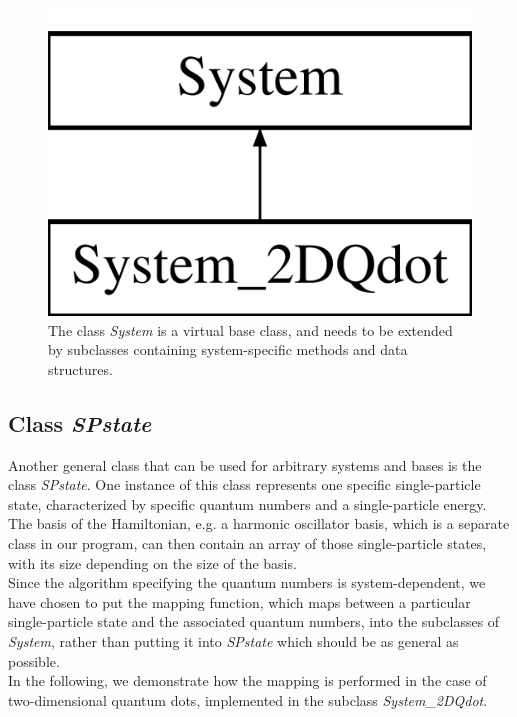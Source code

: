 \begin{figure}
\begin{center}
\includegraphics[scale=0.15]{../Plots/classSystem.pdf}
\end{center}
\caption{The class \textit{System} is a virtual base class, and needs to be extended by subclasses containing system-specific methods and data structures.}
\label{fig:classSystem}
\end{figure}


\subsection{Class \textit{SPstate}}
Another general class that can be used for arbitrary systems and bases is the class \textit{SPstate}. One instance of this class represents one specific single-particle state, characterized by specific quantum numbers and a single-particle energy. The basis of the Hamiltonian, e.g. a harmonic oscillator basis, which is a separate class in our program, can then contain an array of those single-particle states, with its size depending on the size of the basis.\\
Since the algorithm specifying the quantum numbers is system-dependent, we have chosen to put the mapping function, which maps between a particular single-particle state and the associated quantum numbers, into the  subclasses of \textit{System}, rather than putting it into \textit{SPstate} which should be as general as possible.\\
In the following, we demonstrate how the mapping is performed in the case of two-dimensional quantum dots, implemented in the subclass \textit{System\_2DQdot}.

